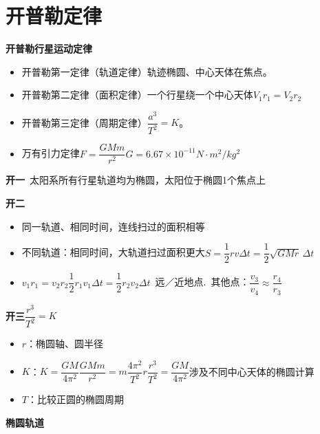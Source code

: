 \section{开普勒定律}
\textbf{开普勒行星运动定律}
\begin{itemize}
  \item 开普勒第一定律（轨道定律）\quad 轨迹椭圆、中心天体在焦点。
  \item 开普勒第二定律（面积定律）\quad 一个行星绕一个中心天体\quad $V_1r_1=V_2r_2$
  \item 开普勒第三定律（周期定律）\quad $\dfrac{a^3}{T^2}=K$。
  \item 万有引力定律\quad $F=\dfrac{GMm}{r^2}$\quad $G=6.67\times10^{-11}\unit{N\cdot m^2/kg^2}$
\end{itemize}

\textbf{开一}\ 太阳系所有行星轨道均为椭圆，太阳位于椭圆1个焦点上%

\textbf{开二}
\begin{itemize}
\item 同一轨道、相同时间，连线扫过的面积相等
\item 不同轨道：相同时间，大轨道扫过面积更大\quad $S=\dfrac{1}{2}rv\Delta t=\dfrac{1}{2}\sqrt{GMr}\,\Delta t$
\item $v_1r_1=v_2r_2$\quad $\dfrac{1}{2}r_1v_1\Delta t=\dfrac{1}{2}r_2v_2\Delta t$\ 远／近地点.\ 其他点：$\dfrac{v_3}{v_4}\approx\dfrac{r_4}{r_3}$
\end{itemize}


\textbf{开三}\quad $\dfrac{r^{3}}{T^{2}}=K$
\begin{itemize}
\item $r$：椭圆轴、圆半径
\item $K$：$K=\dfrac{GM}{4\pi^{2}}$\quad $\dfrac{GMm}{r^{2}}=m\dfrac{4\pi^{2}}{T^{2}}r$\quad $\dfrac{r^{3}}{T^{2}}=\dfrac{GM}{4\pi^{2}}$\quad 涉及不同中心天体的椭圆计算
\item $T$：比较正圆的椭圆周期
\end{itemize}

\textbf{椭圆轨道}

